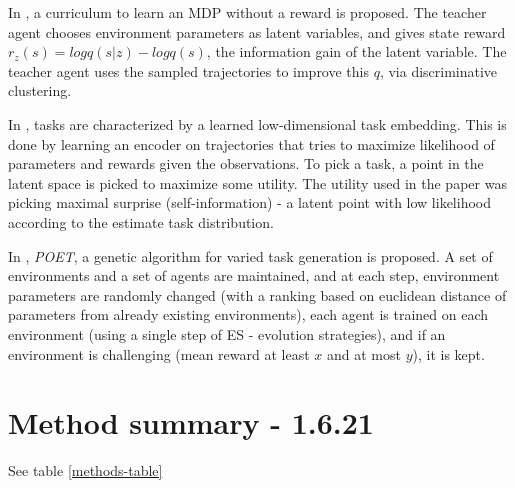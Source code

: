 \documentclass[letterpaper]{article}
\theoremstyle{definition}
\begin{document}
In \cite{Jabri2019}, a curriculum to learn an MDP without a reward is proposed. The teacher agent chooses environment parameters as latent variables, and gives state reward $r_z(s) = log q(s|z) - log q(s)$, the information gain of the latent variable. The teacher agent uses the sampled trajectories to improve this $q$, via discriminative clustering.

In \cite{Kaddour2020}, tasks are characterized by a learned low-dimensional task embedding. This is done by learning an encoder on trajectories that tries to maximize likelihood of parameters and rewards given the observations. To pick a task, a point in the latent space is picked to maximize some utility.
The utility used in the paper was picking maximal surprise (self-information) - a latent point with low likelihood according to the estimate task distribution.

In \cite{Wang2019}, \textit{POET}, a genetic algorithm for varied task generation is proposed. A set of environments and a set of agents are maintained, and at each step, environment parameters are randomly changed (with a ranking based on euclidean distance of parameters from already existing environments), each agent is trained on each environment (using a single step of ES - evolution strategies), and if an environment is challenging (mean reward at least $x$ and at most $y$), it is kept.

\section{Method summary - 1.6.21} \label{sec:summary}

See table \ref{methods-table}
\end{document}
